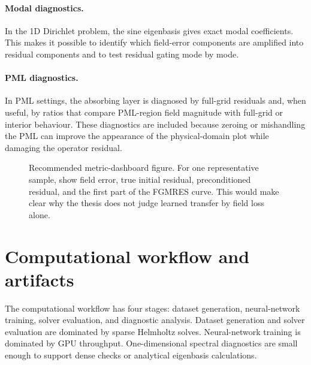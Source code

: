 \paragraph{Modal diagnostics.}
In the 1D Dirichlet problem, the sine eigenbasis gives exact modal
coefficients. This makes it possible to identify which field-error components
are amplified into residual components and to test residual gating mode by
mode.

\paragraph{PML diagnostics.}
In PML settings, the absorbing layer is diagnosed by full-grid residuals and,
when useful, by ratios that compare PML-region field magnitude with full-grid
or interior behaviour. These diagnostics are included because zeroing or
mishandling the PML can improve the appearance of the physical-domain plot
while damaging the operator residual.

\begin{figure}[htbp]
    \centering
    \caption{Recommended metric-dashboard figure. For one representative
    sample, show field error, true initial residual, preconditioned residual,
    and the first part of the FGMRES curve. This would make clear why the
    thesis does not judge learned transfer by field loss alone.}
    \label{fig:setup-metric-dashboard}
\end{figure}

\section{Computational workflow and artifacts}
\label{sec:setup-workflow-artifacts}

The computational workflow has four stages: dataset generation,
neural-network training, solver evaluation, and diagnostic analysis. Dataset
generation and solver evaluation are dominated by sparse Helmholtz solves.
Neural-network training is dominated by GPU throughput. One-dimensional
spectral diagnostics are small enough to support dense checks or analytical
eigenbasis calculations.

